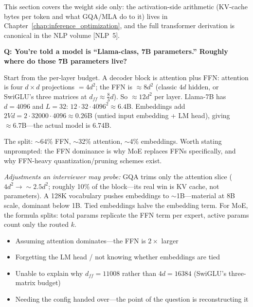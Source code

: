 This section covers the weight side only: the activation-side arithmetic (KV-cache bytes per token and what GQA/MLA do to it) lives in Chapter~\ref{chap:inference_optimization}, and the full transformer derivation is canonical in the NLP volume [NLP~5].

\begin{interviewq}
\textbf{Q: You're told a model is ``Llama-class, 7B parameters.'' Roughly where do those 7B parameters live?}

 \quad {} \quad \badgefreq{\freqhigh}

\stronganswer Start from the per-layer budget. A decoder block is attention plus FFN: attention is four $d \times d$ projections $= 4d^2$; the FFN is $\approx 8d^2$ (classic $4d$ hidden, or SwiGLU's three matrices at $d_{ff} \approx \tfrac{8}{3}d$). So $\approx 12d^2$ per layer. Llama-7B has $d = 4096$ and $L = 32$: $12 \cdot 32 \cdot 4096^2 \approx 6.4$B. Embeddings add $2Vd = 2 \cdot 32000 \cdot 4096 \approx 0.26$B (untied input embedding + LM head), giving $\approx 6.7$B---the actual model is 6.74B.

The split: $\sim$64\% FFN, $\sim$32\% attention, $\sim$4\% embeddings. Worth stating unprompted: the FFN dominance is why MoE replaces FFNs specifically, and why FFN-heavy quantization/pruning schemes exist.

\textit{Adjustments an interviewer may probe:} GQA trims only the attention slice ($4d^2 \to \sim 2.5d^2$; roughly 10\% of the block---its real win is KV cache, not parameters). A 128K vocabulary pushes embeddings to $\sim$1B---material at 8B scale, dominant below 1B. Tied embeddings halve the embedding term. For MoE, the formula splits: total params replicate the FFN term per expert, active params count only the routed $k$.

\redflags
\begin{itemize}
    \item Assuming attention dominates---the FFN is $2\times$ larger
    \item Forgetting the LM head / not knowing whether embeddings are tied
    \item Unable to explain why $d_{ff} = 11008$ rather than $4d = 16384$ (SwiGLU's three-matrix budget)
    \item Needing the config handed over---the point of the question is reconstructing it
\end{itemize}



\end{interviewq}
